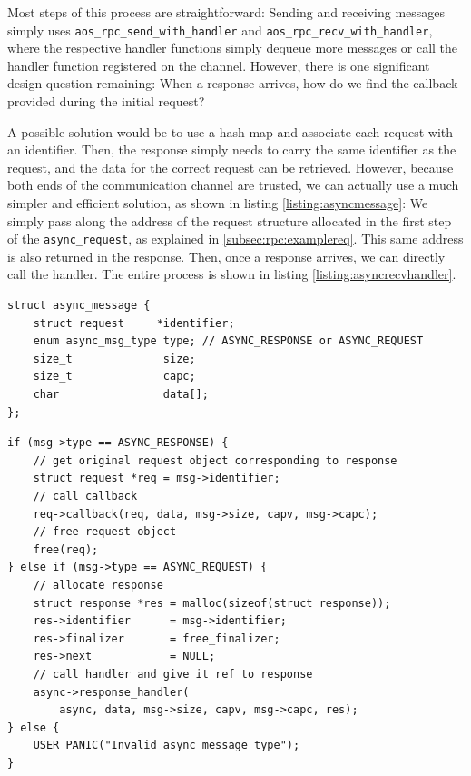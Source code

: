Most steps of this process are straightforward: Sending and receiving messages simply uses \texttt{aos\_rpc\_send\_with\_handler} and \texttt{aos\_rpc\_recv\_with\_handler}, where the respective handler functions simply dequeue more messages or call the handler function registered on the channel. However, there is one significant design question remaining: When a response arrives, how do we find the callback provided during the initial request?

A possible solution would be to use a hash map and associate each request with an identifier. Then, the response simply needs to carry the same identifier as the request, and the data for the correct request can be retrieved. However, because both ends of the communication channel are trusted, we can actually use a much simpler and efficient solution, as shown in listing \ref{listing:asyncmessage}: We simply pass along the address of the request structure allocated in the first step of the \texttt{async\_request}, as explained in \ref{subsec:rpc:examplereq}. This same address is also returned in the response. Then, once a response arrives, we can directly call the handler. The entire process is shown in listing \ref{listing:asyncrecvhandler}.

\begin{lstlisting}[caption={The message type used on the async channel},label={listing:asyncmessage}]
struct async_message {
    struct request     *identifier;
    enum async_msg_type type; // ASYNC_RESPONSE or ASYNC_REQUEST
    size_t              size;
    size_t              capc;
    char                data[];
};
\end{lstlisting}

\begin{lstlisting}[caption={Propagating and directly accessing message identifiers},label={listing:asyncrecvhandler}]
if (msg->type == ASYNC_RESPONSE) {
    // get original request object corresponding to response
    struct request *req = msg->identifier;
    // call callback
    req->callback(req, data, msg->size, capv, msg->capc);
    // free request object
    free(req);
} else if (msg->type == ASYNC_REQUEST) {
    // allocate response
    struct response *res = malloc(sizeof(struct response));
    res->identifier      = msg->identifier;
    res->finalizer       = free_finalizer;
    res->next            = NULL;
    // call handler and give it ref to response
    async->response_handler(
        async, data, msg->size, capv, msg->capc, res);
} else {
    USER_PANIC("Invalid async message type");
}
\end{lstlisting}

